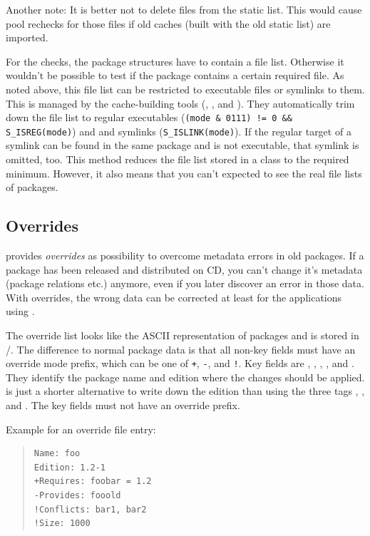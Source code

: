 \documentclass[10pt]{article}
\begin{document}
Another note: It is better not to delete files from the static list.
This would cause pool rechecks for those files if old caches (built
with the old static list) are imported.

For the checks, the package structures have to contain a file list.
Otherwise it wouldn't be possible to test if the package contains a
certain required file. As noted above, this file list can be
restricted to executable files or symlinks to them. This is managed by
the cache-building tools (\MKSUMPROG, \ICACHEPROG, and
\ASCIITOSUMPROG). They automatically trim down the file list to
regular executables (\verb'(mode & 0111) != 0 && S_ISREG(mode)') and
and symlinks (\verb'S_ISLINK(mode)'). If the regular target of a
symlink can be found in the same package and is not executable, that
symlink is omitted, too. This method reduces the file list stored in a
class  to the required minimum. However, it also means
that you can't expected to see the real file lists of packages.


\subsection{Overrides}
\label{pkgdb-overrides}

 provides {\em overrides} as possibility to overcome
metadata errors in old packages. If a package has been released and
distributed on CD, you can't change it's metadata (package relations
etc.) anymore, even if you later discover an error in those data. With
overrides, the wrong data can be corrected at least for the
applications using .

The override list looks like the ASCII representation of packages and
is stored in \PKGDBULIBPATH\slash\OVERRIDESFILENAME. The difference to
normal package data is that all non-key fields must have an override
mode prefix, which can be one of \texttt{+}, \texttt{-}, and
\texttt{!}. Key fields are , , ,
, and . They identify the package name and
edition where the changes should be applied.  is just a
shorter alternative to write down the edition than using the three
tags , , and . The key fields
must not have an override prefix.

Example for an override file entry:
\begin{quote}
\begin{verbatim}
Name: foo
Edition: 1.2-1
+Requires: foobar = 1.2
-Provides: fooold
!Conflicts: bar1, bar2
!Size: 1000
\end{verbatim}
\end{quote}
\end{document}
